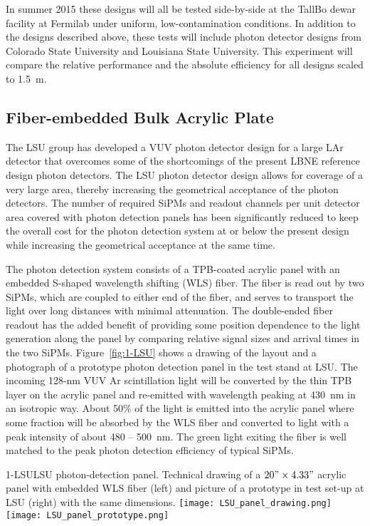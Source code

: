 In summer 2015 these designs will all be tested side-by-side at the
TallBo dewar facility at Fermilab under uniform, low-contamination
conditions.  In addition to the designs described above, these tests
will include photon detector designs from Colorado State University
and Louisiana State University.  This experiment will compare the
relative performance and the absolute efficiency for all designs
scaled to 1.5~m.

\subsection{Fiber-embedded Bulk Acrylic Plate}

The LSU group has developed a VUV photon detector design for a large
LAr detector that overcomes some of the shortcomings of the present
LBNE reference design photon detectors. The LSU photon detector design
allows for coverage of a very large area, thereby increasing the
geometrical acceptance of the photon detectors. The number of required
SiPMs and readout channels per unit detector area covered with photon
detection panels has been significantly reduced to keep the overall
cost for the photon detection system at or below the present design
while increasing the geometrical acceptance at the same time.

The photon detection system consists of a TPB-coated acrylic panel
with an embedded S-shaped wavelength shifting (WLS) fiber. The fiber
is read out by two SiPMs, which are coupled to either end of the fiber,
and serves to transport the light over long distances with minimal
attenuation. The double-ended fiber readout has the added benefit of
providing some position dependence to the light generation along the
panel by comparing relative signal sizes and arrival times in the two
SiPMs. Figure~\ref{fig:1-LSU} shows a drawing of the layout and a
photograph of a prototype photon detection panel in the test stand at
LSU.  The incoming 128-nm VUV Ar scintillation light will be converted
by the thin TPB layer on the acrylic panel and re-emitted with
wavelength peaking at 430~nm in an isotropic way. About 50\% of the
light is emitted into the acrylic panel where some fraction will
be absorbed by the WLS fiber and converted to light with a peak
intensity of about 480 -- 500~nm. The green light exiting the fiber is
well matched to the peak photon detection efficiency of typical SiPMs.

\begin{cdrfigure}{1-LSU}{LSU photon-detection panel. Technical drawing of a $20"\times4.33"$ acrylic panel with embedded WLS fiber (left) and picture of a prototype in test set-up at LSU (right) with the same dimensions.}
\texttt{[image: LSU\_panel\_drawing.png]}
\texttt{[image: LSU\_panel\_prototype.png]}
\end{cdrfigure}

